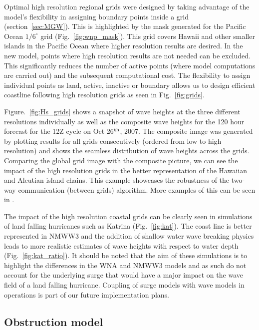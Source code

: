 \documentclass[12pt]{article}
\newcommand{\degree}{^\circ}
\begin{document}
Optimal high resolution regional grids were designed by taking
advantage of the model's flexibility in assigning boundary points
inside a grid (section~\ref{sec:MGW}). This is highlighted by the mask
generated for the Pacific Ocean $1/6\degree$ grid
(Fig.~\ref{fig:wnp_mask}). This grid covers Hawaii and other smaller
islands in the Pacific Ocean where higher resolution results are
desired. In the new model, points where high resolution results are
not needed can be excluded. This significantly reduces the number of
active points (where model computations are carried out) and the
subsequent computational cost. The flexibility to assign individual
points as land, active, inactive or boundary allows us to design
efficient coastline following high resolution grids as seen in
Fig.~\ref{fig:grids}. 

Figure.~\ref{fig:Hs_grids} shows a snapshot of wave heights at the
three different resolutions individually as well as the composite wave
heights for the 120 hour forecast for the 12Z cycle on Oct 26$^{\rm
th}$, 2007. The composite image was generated by plotting results for
all grids consecutively (ordered from low to high resolution) and
shows the seamless distribution of wave heights across the
grids. Comparing the global grid image with the composite picture, we
can see the impact of the high resolution grids in the better
representation of the Hawaiian and Aleutian island chains. This example
showcases the robustness of the two-way communication (between grids)
algorithm. More examples of this can be seen in \cite{tolman-08}.

The impact of the high resolution coastal grids can be clearly seen in
simulations of land falling hurricanes such as Katrina
(Fig.~\ref{fig:kat}). The coast line is better represented in NMWW3
and the addition of shallow water wave breaking physics leads to more
realistic estimates of wave heights with respect to water depth
(Fig.~\ref{fig:kat_ratio}). It should be noted that the aim of these
simulations is to highlight the differences in the WNA and NMWW3
models and as such do not account for the underlying surge that would
have a major impact on the wave field of a land falling
hurricane. Coupling of surge models with wave models in operations is
part of our future implementation plans.

\subsection{Obstruction model}
\end{document}
